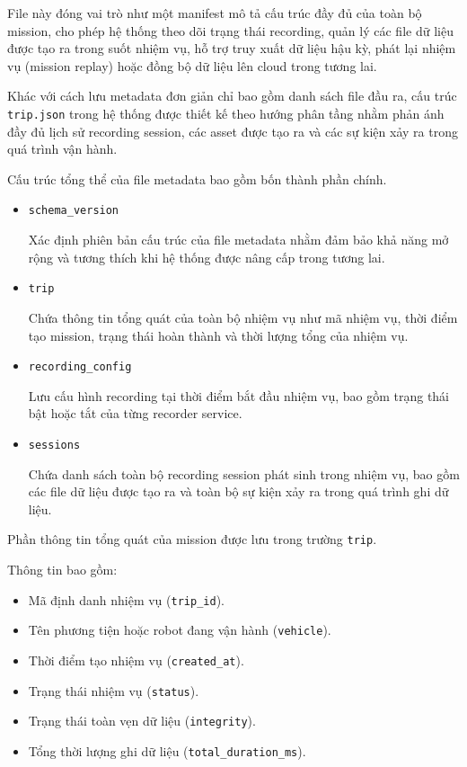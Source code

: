 \documentclass[../DoAn.tex]{subfiles}
\begin{document}
File này đóng vai trò như một manifest mô tả cấu trúc đầy đủ của toàn bộ mission, cho phép hệ thống theo dõi trạng thái recording, quản lý các file dữ liệu được tạo ra trong suốt nhiệm vụ, hỗ trợ truy xuất dữ liệu hậu kỳ, phát lại nhiệm vụ (mission replay) hoặc đồng bộ dữ liệu lên cloud trong tương lai.

Khác với cách lưu metadata đơn giản chỉ bao gồm danh sách file đầu ra, cấu trúc \texttt{trip.json} trong hệ thống được thiết kế theo hướng phân tầng nhằm phản ánh đầy đủ lịch sử recording session, các asset được tạo ra và các sự kiện xảy ra trong quá trình vận hành.

Cấu trúc tổng thể của file metadata bao gồm bốn thành phần chính.

\begin{itemize}
    \item \texttt{schema\_version}
    
    Xác định phiên bản cấu trúc của file metadata nhằm đảm bảo khả năng mở rộng và tương thích khi hệ thống được nâng cấp trong tương lai.

    \item \texttt{trip}
    
    Chứa thông tin tổng quát của toàn bộ nhiệm vụ như mã nhiệm vụ, thời điểm tạo mission, trạng thái hoàn thành và thời lượng tổng của nhiệm vụ.

    \item \texttt{recording\_config}
    
    Lưu cấu hình recording tại thời điểm bắt đầu nhiệm vụ, bao gồm trạng thái bật hoặc tắt của từng recorder service.

    \item \texttt{sessions}
    
    Chứa danh sách toàn bộ recording session phát sinh trong nhiệm vụ, bao gồm các file dữ liệu được tạo ra và toàn bộ sự kiện xảy ra trong quá trình ghi dữ liệu.
\end{itemize}

Phần thông tin tổng quát của mission được lưu trong trường \texttt{trip}.

Thông tin bao gồm:

\begin{itemize}
    \item Mã định danh nhiệm vụ (\texttt{trip\_id}).
    \item Tên phương tiện hoặc robot đang vận hành (\texttt{vehicle}).
    \item Thời điểm tạo nhiệm vụ (\texttt{created\_at}).
    \item Trạng thái nhiệm vụ (\texttt{status}).
    \item Trạng thái toàn vẹn dữ liệu (\texttt{integrity}).
    \item Tổng thời lượng ghi dữ liệu (\texttt{total\_duration\_ms}).
\end{itemize}
\end{document}
